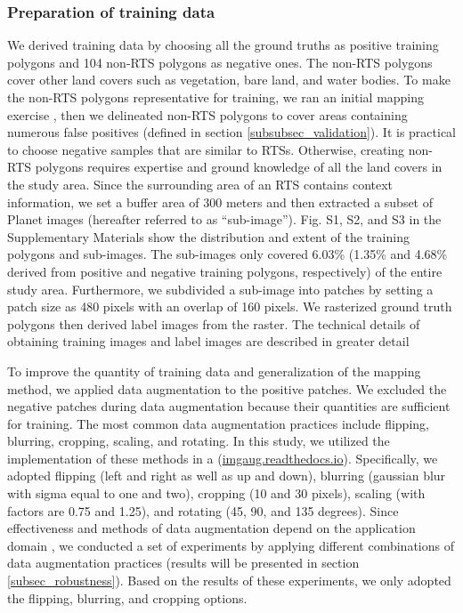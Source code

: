 \documentclass[authoryear,preprint,review,12pt]{elsarticle}
\begin{document}
\subsubsection{Preparation of training data}
\label{subsubsec_pre_trainingdata}

We derived training data by choosing all the ground truths as positive training polygons and 104 non-RTS polygons as negative ones. The non-RTS polygons cover other land covers such as vegetation, bare land, and water bodies. To make the non-RTS polygons representative for training, we ran an initial mapping exercise , then we delineated non-RTS polygons to cover areas containing numerous false positives (defined in section \ref{subsubsec_validation}). It is practical to choose negative samples that are similar to RTSs. Otherwise, creating non-RTS polygons requires expertise and ground knowledge of all the land covers in the study area. Since the surrounding area of an RTS contains context information, we set a buffer area of 300 meters and then extracted a subset of Planet images (hereafter referred to as “sub-image”). Fig. S1, S2, and S3 in the Supplementary Materials show the distribution and extent of the training polygons and sub-images. The sub-images only covered 6.03\% (1.35\% and 4.68\% derived from positive and negative training polygons, respectively) of the entire study area. Furthermore, we subdivided a sub-image into patches by setting a patch size as 480 pixels with an overlap of 160 pixels.  We rasterized ground truth polygons then derived label images from the raster. The technical details of obtaining training images and label images are described in greater detail   

To improve the quantity of training data and generalization of the mapping method, we applied data augmentation to the positive patches.  We excluded the negative patches during data augmentation because their quantities are sufficient for training. The most common data augmentation practices include flipping, blurring, cropping, scaling, and rotating. In this study, we utilized the implementation of these methods in a  (\url{imgaug.readthedocs.io}). Specifically, we adopted flipping (left and right as well as up and down), blurring (gaussian blur with sigma equal to one and two), cropping (10 and 30 pixels), scaling (with factors are 0.75 and 1.25), and rotating (45, 90, and 135 degrees). Since effectiveness and methods of data augmentation depend on the application domain \citep{perez2017effectiveness}, we conducted a set of experiments by applying different combinations of data augmentation practices (results will be presented in section \ref{subsec_robustness}). Based on the results of these experiments, we only adopted the flipping, blurring, and cropping options. 
\end{document}
